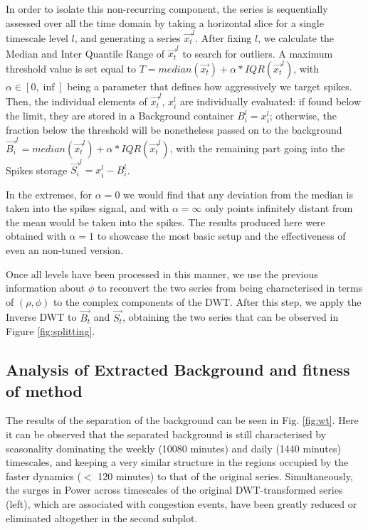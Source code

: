\documentclass[a4paper, 10pt, conference]{ieeeconf}      %
\begin{document}
In order to isolate this non-recurring component, the series is sequentially assessed over all the time domain by taking a horizontal slice for a single timescale level $l$, and generating a series $\vec{x_{t}}^l$.
After fixing $l$, we calculate the Median and Inter Quantile Range of $\vec{x_{t}}^l$ to search for outliers.
A maximum threshold value is set equal to $T = median(\vec{x_t}) + \alpha * IQR(\vec{x_{t}}^l)$, with $\alpha \in [0,\inf]$ being a parameter that defines how aggressively we target spikes. 
Then, the individual elements of $\vec{x_{t}}^l$, $x_{i}^l$ are individually evaluated: if found below the limit, they are stored in a Background container $B_i^l = x_{i}^l$; otherwise, the fraction below the threshold will be nonetheless passed on to the background $\vec{B_i}^l = median(\vec{x_{t}}^l) + \alpha * IQR(\vec{x_{t}}^l)$, with the remaining part going into the Spikes storage $\vec{S_i}^l = x_{i}^l - B_{i}^l$.

In the extremes, for $\alpha = 0$ we would find that any deviation from the median is taken into the spikes signal, and with $\alpha = \infty$ only points infinitely distant from the mean would be taken into the spikes.
The results produced here were obtained with $\alpha=1$ to showcase the most basic setup and the effectiveness of even an non-tuned version.

Once all levels have been processed in this manner, we use the previous information about $\phi$ to reconvert the two series from being characterised in terms of $(\rho, \phi)$ to the complex components of the DWT.
After this step, we apply the Inverse DWT to $\vec{B_t}$ and $\vec{S_t}$, obtaining the two series that can be observed in Figure \ref{fig:splitting}.
\subsection{Analysis of Extracted Background and fitness of method}
The results of the separation of the background can be seen in Fig. \ref{fig:wt}. Here it can be observed that the separated background is still characterised by seasonality dominating the weekly (10080 minutes) and daily (1440 minutes) timescales, and keeping a very similar structure in the regions occupied by the faster dynamics ($<$ 120 minutes) to that of the original series.
Simultaneously, the surges in Power across timescales of the original DWT-transformed series (left), which are associated with congestion events, have been greatly reduced or eliminated altogether in the second subplot.
\end{document}
